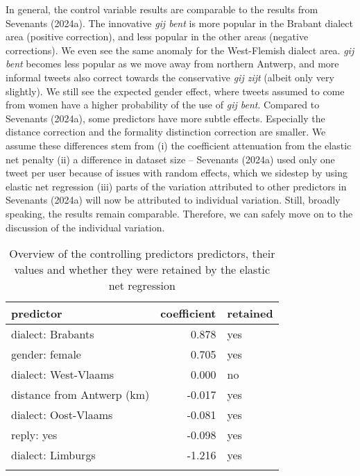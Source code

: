 \documentclass[
  letterpaper,
  DIV=11,
  numbers=noendperiod,
  oneside]{scrartcl}
\begin{document}
In general, the control variable results are comparable to the results
from Sevenants (2024a). The innovative \emph{gij bent} is more popular
in the Brabant dialect area (positive correction), and less popular in
the other areas (negative corrections). We even see the same anomaly for
the West-Flemish dialect area. \emph{gij
bent} becomes less popular as we move away from northern Antwerp, and
more informal tweets also correct towards the conservative \emph{gij
zijt} (albeit only very slightly). We still see the expected gender
effect, where tweets assumed to come from women have a higher
probability of the use of \emph{gij bent}. Compared to Sevenants
(2024a), some predictors have more subtle effects. Especially the
distance correction and the formality distinction correction are
smaller. We assume these differences stem from (i) the coefficient
attenuation from the elastic net penalty (ii) a difference in dataset
size -- Sevenants (2024a) used only one tweet per user because of issues
with random effects, which we sidestep by using elastic net regression
(iii) parts of the variation attributed to other predictors in Sevenants
(2024a) will now be attributed to individual variation. Still, broadly
speaking, the results remain comparable. Therefore, we can safely move
on to the discussion of the individual variation.

\begin{longtable}[]{@{}lrl@{}}

\toprule\noalign{}
predictor & coefficient & retained \\
\midrule\noalign{}
\endhead
\bottomrule\noalign{}
\endlastfoot
dialect: Brabants & 0.878 & yes \\
gender: female & 0.705 & yes \\
dialect: West-Vlaams & 0.000 & no \\
distance from Antwerp (km) & -0.017 & yes \\
dialect: Oost-Vlaams & -0.081 & yes \\
reply: yes & -0.098 & yes \\
dialect: Limburgs & -1.216 & yes \\


\caption{\label{tbl-other-coefficients}Overview of the controlling
predictors predictors, their values and whether they were retained by
the elastic net regression}

\tabularnewline
\end{longtable}
\end{document}
